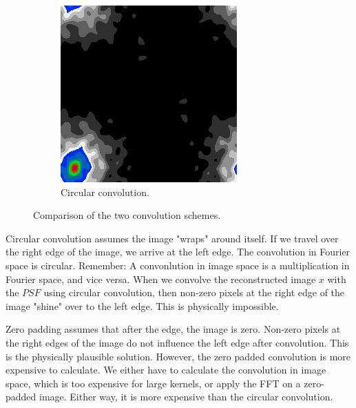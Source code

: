 \begin{figure}[h]
\begin{subfigure}[b]{0.3\linewidth}
		\includegraphics[width=\linewidth]{./chapters/03.distribution/simulated/circular.png}
		\caption{Circular convolution.}
		\label{cd:efficient:convolution:circular}
	\end{subfigure}
	\caption{Comparison of the two convolution schemes.}
	\label{cd:efficient:convolution:figure}
\end{figure}

Circular convolution assumes the image "wraps" around itself. If we travel over the right edge of the image, we arrive at the left edge. The convolution in Fourier space is circular. Remember: A convonlution in image space is a multiplication in Fourier space, and vice versa. When we convolve the reconstructed image $x$ with the $PSF$ using circular convolution, then non-zero pixels at the right edge of the image "shine" over to the left edge. This is physically impossible.

Zero padding assumes that after the edge, the image is zero. Non-zero pixels at the right edges of the image do not influence the left edge after convolution. This is the physically plausible solution. However, the zero padded convolution is more expensive to calculate. We either have to calculate the convolution in image space, which is too expensive for large kernels, or apply the FFT on a zero-padded image. Either way, it is more expensive than the circular convolution.

